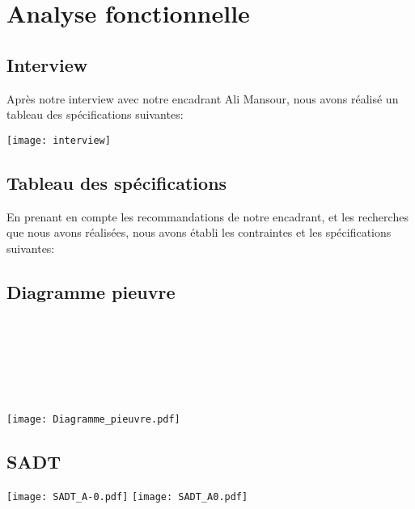 \chapter{Analyse fonctionnelle}

\section{Interview}

Après notre interview avec notre encadrant Ali Mansour, nous avons réalisé un tableau des spécifications suivantes:

\texttt{[image: interview]}


\section{Tableau des spécifications}
En prenant en compte les recommandations de notre encadrant, et les recherches que nous avons réalisées, nous avons établi les contraintes et les spécifications suivantes:





\section{Diagramme pieuvre}
~\\
~\\
~\\
~\\
~\\
~\\
\hspace{-2cm}
\texttt{[image: Diagramme\_pieuvre.pdf]}



\section{SADT}

\texttt{[image: SADT\_A-0.pdf]}
\texttt{[image: SADT\_A0.pdf]}

